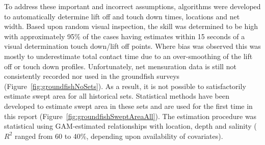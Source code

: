 \documentclass[letterpaper,portrait,11pt]{scrartcl}
\numberwithin{equation}{section}		%
\numberwithin{figure}{section}		%
\numberwithin{table}{section}				%
\newcommand{\ecomod}{\string~/ecomod_data/}   %
\begin{document}
To address these important and incorrect assumptions, algorithms were developed to automatically determine lift off and touch down times, locations and net width. Based upon random visual inspection, the skill was determined to be high with approximately 95\% of the cases having estimates within 15 seconds of a visual determination touch down/lift off points. Where bias was observed this was mostly to underestimate total contact time due to an over-smoothing of the lift off or touch down profiles. Unfortunately, net mensuration data is still not consistently recorded nor used in the groundfish surveys (Figure~\ref{fig:groundfishNoSets}). As a result, it is not possible to satisfactorily estimate swept area for all historical sets. Statistical methods have been developed to estimate swept area in these sets and are used for the first time in this report (Figure~\ref{fig:groundfishSweptAreaAll}). The estimation procedure was statistical using GAM-estimated relationships with location, depth and salinity ($R^2$ ranged from 60 to 40\%, depending upon availability of covariates). 







\end{document}
